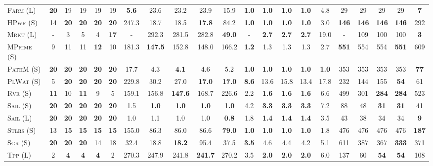 \documentclass[11pt,landscape]{article}
\begin{document}
\begin{table}[tb]
{\begin{tabular}{|l||ccccc||ccccc||ccccc||ccccc||}
\textsc{Farm} (L)&\textbf{20}&19&19&19&19&\textbf{5.6}&23.6&23.2&23.9&15.9&\textbf{1.0}&\textbf{1.0}&\textbf{1.0}&\textbf{1.0}&4.8&29&29&29&29&\textbf{7}\\
\textsc{HPwr} (S)&14&\textbf{20}&\textbf{20}&\textbf{20}&\textbf{20}&247.3&18.7&18.5&\textbf{17.8}&84.2&\textbf{1.0}&\textbf{1.0}&\textbf{1.0}&\textbf{1.0}&3.0&\textbf{146}&\textbf{146}&\textbf{146}&\textbf{146}&292\\
\textsc{Mrkt} (L)&-&3&5&4&\textbf{17}&-&292.3&281.5&282.8&\textbf{49.0}&-&\textbf{2.7}&\textbf{2.7}&\textbf{2.7}&19.0&-&109&100&100&\textbf{3}\\
\textsc{MPrime} (S)&9&11&11&\textbf{12}&10&181.3&\textbf{147.5}&152.8&148.0&166.2&\textbf{1.2}&1.3&1.3&1.3&2.7&\textbf{551}&554&554&\textbf{551}&609\\
\textsc{PathM} (S)&\textbf{20}&\textbf{20}&\textbf{20}&\textbf{20}&\textbf{20}&17.7&4.3&\textbf{4.1}&4.6&5.2&\textbf{1.0}&\textbf{1.0}&\textbf{1.0}&\textbf{1.0}&\textbf{1.0}&353&353&353&353&\textbf{77}\\
\textsc{PlWat} (S)&5&\textbf{20}&\textbf{20}&\textbf{20}&\textbf{20}&229.8&30.2&27.0&\textbf{17.0}&\textbf{17.0}&\textbf{8.6}&13.6&15.8&13.4&17.8&232&144&155&\textbf{54}&61\\
\textsc{Rvr} (S)&\textbf{11}&10&\textbf{11}&9&5&159.1&156.8&\textbf{147.6}&168.7&226.6&2.2&\textbf{1.6}&\textbf{1.6}&\textbf{1.6}&6.6&499&301&\textbf{284}&\textbf{284}&523\\
\textsc{Sail} (S)&\textbf{20}&\textbf{20}&\textbf{20}&\textbf{20}&\textbf{20}&1.5&\textbf{1.0}&\textbf{1.0}&\textbf{1.0}&\textbf{1.0}&4.2&\textbf{3.3}&\textbf{3.3}&\textbf{3.3}&7.2&88&48&\textbf{31}&\textbf{31}&41\\
\textsc{Sail} (L)&\textbf{20}&\textbf{20}&\textbf{20}&\textbf{20}&\textbf{20}&1.0&1.1&1.0&1.0&\textbf{0.8}&1.8&\textbf{1.4}&\textbf{1.4}&\textbf{1.4}&3.5&43&38&34&34&\textbf{9}\\
\textsc{Stlrs} (S)&13&\textbf{15}&\textbf{15}&\textbf{15}&\textbf{15}&155.0&86.3&86.0&86.6&\textbf{79.0}&\textbf{1.0}&\textbf{1.0}&\textbf{1.0}&\textbf{1.0}&1.8&476&476&476&476&\textbf{187}\\
\textsc{Sgr} (S)&\textbf{20}&\textbf{20}&\textbf{20}&14&18&32.4&18.8&\textbf{18.2}&95.4&37.5&\textbf{3.5}&4.6&4.4&4.2&5.1&611&387&367&\textbf{333}&371\\
\textsc{Tpp} (L)&2&\textbf{4}&\textbf{4}&\textbf{4}&2&270.3&247.9&241.8&\textbf{241.7}&270.2&3.5&\textbf{2.0}&\textbf{2.0}&\textbf{2.0}&6.0&137&60&\textbf{54}&\textbf{54}&108\\

\end{tabular}}
\end{table}
\end{document}
